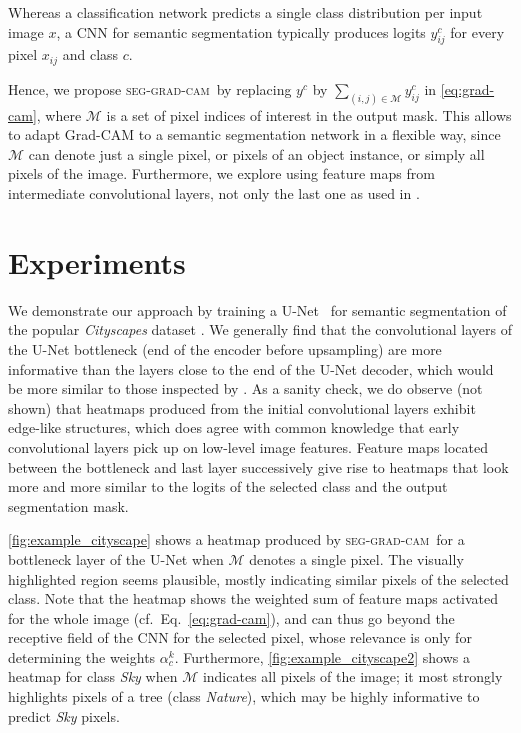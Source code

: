 \documentclass[letterpaper]{article} %
\newcommand{\sgc}{\mbox{\small\textsc{seg-grad-cam}}}
\begin{document}
Whereas a classification network predicts a single class distribution
per input image $x$, a CNN for semantic segmentation typically
produces logits $y_{ij}^c$ for every pixel $x_{ij}$ and class $c$.

Hence, we propose \sgc\  by replacing
$y^c$ by $\sum_{(i,j) \in \mathcal{M}} y_{ij}^c$ in \cref{eq:grad-cam},
where $\mathcal{M}$ is a set of pixel indices of interest in the output mask. 
%
This allows to adapt Grad-CAM to a semantic segmentation network
in a flexible way, since $\mathcal{M}$ can denote just a single pixel,
or pixels of an object instance, or simply all pixels of the image.
%
Furthermore, we explore using feature maps from
intermediate convolutional layers, not only the last one as used in
\citeauthor{selvaraju2017grad} \citeyear{selvaraju2017grad}.




\section{Experiments}
\label{sec:experiments}

We demonstrate our approach by training a U-Net~\cite{ronneberger2015u} for semantic segmentation
of the popular \emph{Cityscapes} dataset \cite{Cordts2016Cityscapes}.
%
We generally find that the convolutional layers of the U-Net bottleneck (end of the encoder before upsampling)
are more informative than the layers close to the end of the U-Net decoder, which would be more similar
to those inspected by \citeauthor{selvaraju2017grad} \citeyear{selvaraju2017grad}.
%
As a sanity check, we do observe (not shown) that heatmaps produced from the initial convolutional layers
exhibit edge-like structures, which does agree with common knowledge that early
convolutional layers pick up on low-level image features.
%
Feature maps located between the bottleneck and last layer successively give rise to heatmaps that look more and more similar to the logits of the selected class and the output segmentation mask.


\cref{fig:example_cityscape} shows a heatmap produced by \sgc\ for a
bottleneck layer of the U-Net when $\mathcal{M}$ denotes a single pixel. The
visually highlighted region seems plausible, mostly indicating similar pixels of
the selected class.
%
Note that the heatmap shows the weighted sum of feature maps activated for the whole
image (cf.~Eq.~\ref{eq:grad-cam}), and can thus go beyond the receptive field of the CNN for the selected pixel,
whose relevance is only for determining the weights $\alpha_c^k$.
%
Furthermore, \cref{fig:example_cityscape2} shows a heatmap for class \emph{Sky}
when $\mathcal{M}$ indicates all pixels of the image; it most strongly highlights pixels of a
tree (class \emph{Nature}), which may be highly informative to predict \emph{Sky} pixels.
\end{document}
